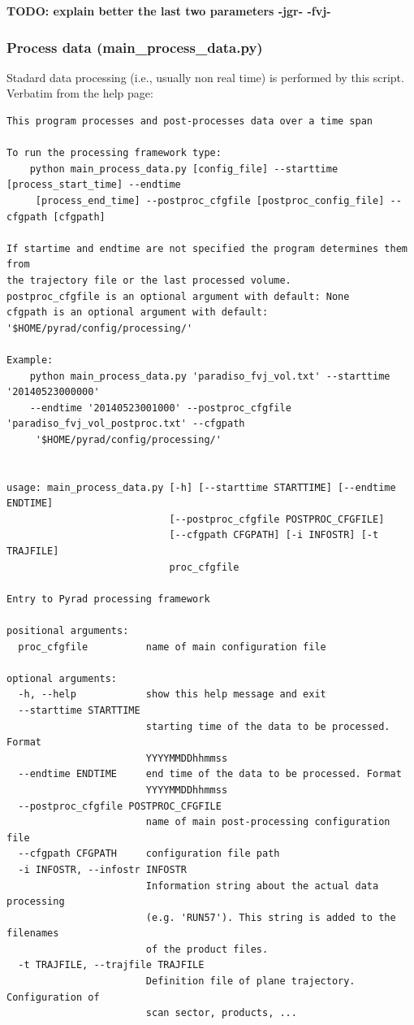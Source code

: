 \documentclass[a4paper,11pt,pdftex,twoside]{scrartcl}
\renewcommand{\bf}{\normalfont \bfseries}
\begin{document}
{\bf TODO: explain better the last two parameters -jgr- -fvj-}

\subsubsection{Process data (main\_process\_data.py)}
Stadard data processing (i.e., usually non real time) is performed by this script.
Verbatim from the help page:

\begin{verbatim}
This program processes and post-processes data over a time span

To run the processing framework type:
    python main_process_data.py [config_file] --starttime [process_start_time] --endtime
     [process_end_time] --postproc_cfgfile [postproc_config_file] --cfgpath [cfgpath]

If startime and endtime are not specified the program determines them from
the trajectory file or the last processed volume.
postproc_cfgfile is an optional argument with default: None
cfgpath is an optional argument with default: '$HOME/pyrad/config/processing/'

Example:
    python main_process_data.py 'paradiso_fvj_vol.txt' --starttime '20140523000000' 
    --endtime '20140523001000' --postproc_cfgfile 'paradiso_fvj_vol_postproc.txt' --cfgpath
     '$HOME/pyrad/config/processing/'


usage: main_process_data.py [-h] [--starttime STARTTIME] [--endtime ENDTIME]
                            [--postproc_cfgfile POSTPROC_CFGFILE]
                            [--cfgpath CFGPATH] [-i INFOSTR] [-t TRAJFILE]
                            proc_cfgfile

Entry to Pyrad processing framework

positional arguments:
  proc_cfgfile          name of main configuration file

optional arguments:
  -h, --help            show this help message and exit
  --starttime STARTTIME
                        starting time of the data to be processed. Format
                        YYYYMMDDhhmmss
  --endtime ENDTIME     end time of the data to be processed. Format
                        YYYYMMDDhhmmss
  --postproc_cfgfile POSTPROC_CFGFILE
                        name of main post-processing configuration file
  --cfgpath CFGPATH     configuration file path
  -i INFOSTR, --infostr INFOSTR
                        Information string about the actual data processing
                        (e.g. 'RUN57'). This string is added to the filenames
                        of the product files.
  -t TRAJFILE, --trajfile TRAJFILE
                        Definition file of plane trajectory. Configuration of
                        scan sector, products, ...


\end{verbatim}
\end{document}
